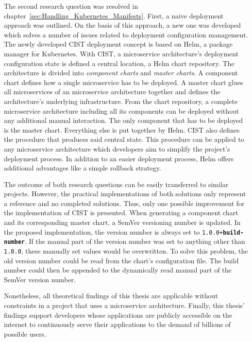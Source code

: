 The second research question was resolved in
chapter~\ref{sec:Handling_Kubernetes_Manifests}. First, a naive deployment
approach was outlined. On the basis of this approach, a new one was developed
which solves a number of issues related to deployment configuration management.
The newly developed \ac{CIST} deployment concept is based on Helm, a package
manager for Kubernetes. With \ac{CIST}, a microservice architecture's
deployment configuration state is defined a central location, a Helm chart
repository. The architecture is divided into \textit{component charts} and
\textit{master charts}. A component chart defines how a single microservice has
to be deployed. A master chart glues all microservices of an microservice
architecture together and defines the architecture's underlying infrastructure.
From the chart repository, a complete microservice architecture including all
its components can be deployed without any additional manual interaction. The
only component that has to be deployed is the master chart. Everything else is
put together by Helm. \ac{CIST} also defines the procedure that produces said
central state. This procedure can be applied to any microservice architecture
which developers aim to simplify the project's deployment process. In addition
to an easier deployment process, Helm offers additional advantages like a
simple rollback strategy.

The outcome of both research questions can be easily transferred to similar
projects. However, the practical implementations of both solutions only
represent a reference and no completed solutions. Thus, only one possible
improvement for the implementation of \ac{CIST} is presented. When generating a
component chart and its corresponding master chart, a SemVer versioning number
is updated. In the proposed implementation, the version number is always set to
\texttt{1.0.0+\textbf{build-number}}. If the manual part of the version number
was set to anything other than \texttt{1.0.0}, these manually set values would
be overwritten. To solve this problem, the old version number could be read
from the chart's configuration file. The build number could then be appended to
the dynamically read manual part of the SemVer version number.

Nonetheless, all theoretical findings of this thesis are applicable without
constraints in a project that uses a microservice architecture. Finally, this
thesis' findings support developers whose applications are publicly accessible
on the internet to continuously serve their applications to the demand of
billions of possible users.

